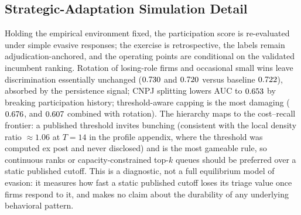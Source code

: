 \subsection{Strategic-Adaptation Simulation Detail}
\label{supp:price_adaptation}

Holding the empirical environment fixed, the participation score is
re-evaluated under simple evasive responses; the exercise is
retrospective, the labels remain adjudication-anchored, and the operating
points are conditional on the validated incumbent ranking. Rotation of
losing-role firms and occasional small wins leave discrimination
essentially unchanged ($0.730$ and $0.720$
versus baseline $0.722$), absorbed by the persistence signal; CNPJ
splitting lowers AUC to $0.653$ by breaking participation
history; threshold-aware capping is the most damaging
($0.676$, and $0.607$ combined with
rotation). The hierarchy maps to the cost--recall frontier: a published
threshold invites bunching (consistent with the local density ratio
$\approx 1.06$ at $T=14$ in the profile appendix, where the threshold was
computed ex post and never disclosed) and is the most gameable rule, so
continuous ranks or capacity-constrained top-$k$ queues should be preferred
over a static published cutoff. This is a diagnostic, not a full
equilibrium model of evasion: it measures how fast a static published
cutoff loses its triage value once firms respond to it, and makes no claim
about the durability of any underlying behavioral pattern.
